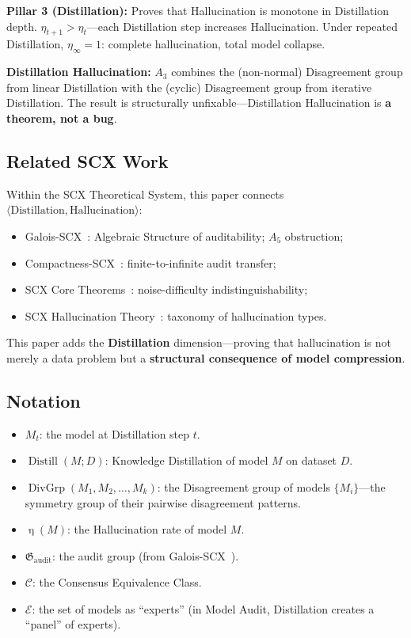 \documentclass[12pt,a4paper]{article}
\theoremstyle{remark}
\newcommand{\AuditGrp}{\mathfrak{G}_{\mathrm{audit}}}
\newcommand{\ExpertSet}{\mathcal{E}}
\newcommand{\CEC}{\mathcal{C}}
\DeclareMathOperator{\Distill}{Distill}
\DeclareMathOperator{\DivGrp}{DivGrp}
\DeclareMathOperator{\HallRate}{\eta}
\begin{document}
\textbf{Pillar 3 (Distillation):} Proves that Hallucination is monotone in Distillation depth. \(\eta_{t+1} > \eta_t\)---each Distillation step increases Hallucination. Under repeated Distillation, \(\eta_{\infty} = 1\): complete hallucination, total model collapse.

\textbf{Distillation Hallucination:} \(A_3\) combines the (non-normal) Disagreement group from linear Distillation with the (cyclic) Disagreement group from iterative Distillation. The result is structurally unfixable---Distillation Hallucination is \textbf{a theorem, not a bug}.

\subsection{Related SCX Work}
Within the SCX Theoretical System, this paper connects \(\langle\text{Distillation}, \text{Hallucination}\rangle\):
\begin{itemize}[itemsep=2pt]
    \item Galois-SCX~\cite{scx_galois}: Algebraic Structure of auditability; \(A_5\) obstruction;
    \item Compactness-SCX~\cite{scx_compactness}: finite-to-infinite audit transfer;
    \item SCX Core Theorems~\cite{scx2026theorems}: noise-difficulty indistinguishability;
    \item SCX Hallucination Theory~\cite{scx_hallucination}: taxonomy of hallucination types.
\end{itemize}

This paper adds the \textbf{Distillation} dimension---proving that hallucination is not merely a data problem but a \textbf{structural consequence of model compression}.

\subsection{Notation}
\begin{itemize}[itemsep=3pt]
    \item \(M_t\): the model at Distillation step \(t\).
    \item \(\Distill(M; D)\): Knowledge Distillation of model \(M\) on dataset \(D\).
    \item \(\DivGrp(M_1, M_2, \ldots, M_k)\): the Disagreement group of models \(\{M_i\}\)---the symmetry group of their pairwise disagreement patterns.
    \item \(\HallRate(M)\): the Hallucination rate of model \(M\).
    \item \(\AuditGrp\): the audit group (from Galois-SCX~\cite{scx_galois}).
    \item \(\CEC\): the Consensus Equivalence Class.
    \item \(\ExpertSet\): the set of models as ``experts'' (in Model Audit, Distillation creates a ``panel'' of experts).
\end{itemize}
\end{document}
